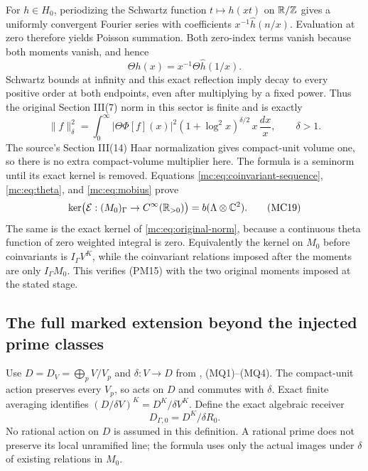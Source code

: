 For $h\in H_0$, periodizing the Schwartz function $t\mapsto h(xt)$
on $\mathbb R/\mathbb Z$ gives a uniformly convergent Fourier series
with coefficients $x^{-1}\widehat h(n/x)$. Evaluation at zero
therefore yields Poisson summation. Both zero-index terms vanish
because both moments vanish, and hence
\[
 \Theta h(x)=x^{-1}\Theta\widehat h(1/x).
 \tag{MC17}\label{mc:eq:poisson}
\]
Schwartz bounds at infinity and this exact reflection imply decay
to every positive order at both endpoints, even after multiplying
by a fixed power. Thus the original Section III(7) norm in this
sector is finite and is exactly
\[
 \|f\|_\delta^2=
 \int_0^\infty|\Theta\Phi[f](x)|^2
        (1+\log^2x)^{\delta/2}\,x\,\frac{dx}{x},
 \qquad\delta>1.
 \tag{MC18}\label{mc:eq:original-norm}
\]
The source's Section III(14) Haar normalization gives compact-unit
volume one, so there is no extra compact-volume multiplier here.
The formula is a seminorm until its exact kernel is removed.
Equations \eqref{mc:eq:coinvariant-sequence}, \eqref{mc:eq:theta}, and
\eqref{mc:eq:mobius} prove
\[
 \ker\bigl(\mathcal E:(M_0)_\Gamma\to
                        C^\infty(\mathbb R_{>0})\bigr)
   =b(\Lambda\otimes\mathbb C^2).
 \tag{MC19}\label{mc:eq:theta-kernel}
\]
The same is the exact kernel of \eqref{mc:eq:original-norm}, because
a continuous theta function of zero weighted integral is zero.
Equivalently the kernel on $M_0$ before coinvariants is
$I_\Gamma V^K$, while the coinvariant relations imposed after
the moments are only $I_\Gamma M_0$. This verifies (PM15) with
the two original moments imposed at the stated stage.

\subsection{The full marked extension beyond the injected prime classes}

Use $D=D_V=\bigoplus_p V/V_p$ and $\delta:V\to D$ from
, (MQ1)--(MQ4).
The compact-unit action preserves every $V_p$, so acts on $D$ and
commutes with $\delta$. Exact finite averaging identifies
$(D/\delta V)^K=D^K/\delta V^K$. Define the exact algebraic
receiver
\[
 D_{\Gamma,0}=D^K/\delta R_0.
 \tag{MC20}\label{mc:eq:marked-coinvariant-receiver}
\]
No rational action on $D$ is assumed in this definition. A rational
prime does not preserve its local unramified line; the formula
uses only the actual images under $\delta$ of existing relations
in $M_0$.

